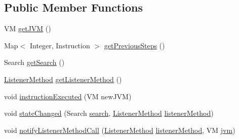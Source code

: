 \subsection*{Public Member Functions}
\begin{DoxyCompactItemize}
\item 
VM \hyperlink{classgov_1_1nasa_1_1jpf_1_1inspector_1_1server_1_1expression_1_1_inspector_state_impl_aacd53b4269a6d721ce2dba20abd3d782}{get\+J\+VM} ()
\item 
Map$<$ Integer, Instruction $>$ \hyperlink{classgov_1_1nasa_1_1jpf_1_1inspector_1_1server_1_1expression_1_1_inspector_state_impl_a0ef0d1393b5865d698c360d1e21ea5f2}{get\+Previous\+Steps} ()
\item 
Search \hyperlink{classgov_1_1nasa_1_1jpf_1_1inspector_1_1server_1_1expression_1_1_inspector_state_impl_accaa8504548659684f49e818415c4f60}{get\+Search} ()
\item 
\hyperlink{enumgov_1_1nasa_1_1jpf_1_1inspector_1_1server_1_1expression_1_1_inspector_state_1_1_listener_method}{Listener\+Method} \hyperlink{classgov_1_1nasa_1_1jpf_1_1inspector_1_1server_1_1expression_1_1_inspector_state_impl_afe75e0f49b3b98bc2e6530d647f43297}{get\+Listener\+Method} ()
\item 
void \hyperlink{classgov_1_1nasa_1_1jpf_1_1inspector_1_1server_1_1expression_1_1_inspector_state_impl_ab4f24df2dfae833b81bd5b6e1cb28f8c}{instruction\+Executed} (VM new\+J\+VM)
\item 
void \hyperlink{classgov_1_1nasa_1_1jpf_1_1inspector_1_1server_1_1expression_1_1_inspector_state_impl_a48d8ba84b9915f6a1c6968c80a23bd2f}{state\+Changed} (Search \hyperlink{classgov_1_1nasa_1_1jpf_1_1inspector_1_1server_1_1expression_1_1_inspector_state_impl_aad68b55c445091d252a965081641b48f}{search}, \hyperlink{enumgov_1_1nasa_1_1jpf_1_1inspector_1_1server_1_1expression_1_1_inspector_state_1_1_listener_method}{Listener\+Method} \hyperlink{classgov_1_1nasa_1_1jpf_1_1inspector_1_1server_1_1expression_1_1_inspector_state_impl_a6cc5f61624118469f3c43361c867f439}{listener\+Method})
\item 
void \hyperlink{classgov_1_1nasa_1_1jpf_1_1inspector_1_1server_1_1expression_1_1_inspector_state_impl_a3655365c4f59212cd19568ae17a25d80}{notify\+Listener\+Method\+Call} (\hyperlink{enumgov_1_1nasa_1_1jpf_1_1inspector_1_1server_1_1expression_1_1_inspector_state_1_1_listener_method}{Listener\+Method} \hyperlink{classgov_1_1nasa_1_1jpf_1_1inspector_1_1server_1_1expression_1_1_inspector_state_impl_a6cc5f61624118469f3c43361c867f439}{listener\+Method}, VM \hyperlink{classgov_1_1nasa_1_1jpf_1_1inspector_1_1server_1_1expression_1_1_inspector_state_impl_a0c9ed60abbbcc0a956d2902347770dda}{jvm})
\end{DoxyCompactItemize}
